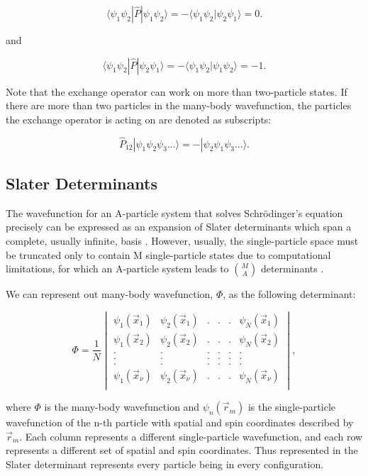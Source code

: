\begin{equation}
    \langle \psi_1 \psi_2 | \hat{P} | \psi_1 \psi_2 \rangle = -\langle \psi_1 \psi_2 | \psi_2 \psi_1 \rangle = 0.
\end{equation}

and

\begin{equation}
    \langle \psi_1 \psi_2 | \hat{P} | \psi_2 \psi_1 \rangle = -\langle \psi_1 \psi_2 | \psi_1 \psi_2 \rangle = -1.
\end{equation}

Note that the exchange operator can work on more than two-particle states. If there are more than two particles in the many-body wavefunction, the particles the exchange operator is acting on are denoted as subscripts:

\begin{equation}
    \hat{P}_{12}|\psi_1 \psi_2 \psi_3 ... \rangle = -|\psi_2 \psi_1 \psi_3...\rangle .
\end{equation}


\subsection*{Slater Determinants}

The wavefunction for an A-particle system that solves Schr\"{o}dinger's equation precisely can be expressed as an expansion of Slater determinants which span a complete, usually infinite, basis \cite{Ref1}. However, usually, the single-particle space must be truncated only to contain M single-particle states due to computational limitations, for which an A-particle system leads to $\binom{M}{A}$ determinants \cite{Ref1}.

We can represent out many-body wavefunction, $\Phi$, as the following determinant:

\begin{equation}
    \Phi = \frac{1}{N} \begin{vmatrix}
        \psi_1(\vec{x}_1) & \psi_2(\vec{x}_1) & . & . & . & \psi_N(\vec{x}_1) \\
        \psi_1(\vec{x}_2) & \psi_2(\vec{x}_2) & . & . & . & \psi_N(\vec{x}_2) \\
        . & . & . & . & . & . \\
        . & . & . & . & . & . \\
        . & . & . & . & . & . \\
        \psi_1(\vec{x}_\nu) & \psi_2(\vec{x}_\nu) & . & . & . & \psi_N(\vec{x}_\nu) \\
    \end{vmatrix},
\end{equation}

where $\Phi$ is the many-body wavefunction and $\psi_n(\vec{r}_m)$ is the single-particle wavefunction of the n-th particle with spatial and spin coordinates described by $\vec{r}_m$. Each column represents a different single-particle wavefunction, and each row represents a different set of spatial and spin coordinates. Thus represented in the Slater determinant represents every particle being in every configuration.
